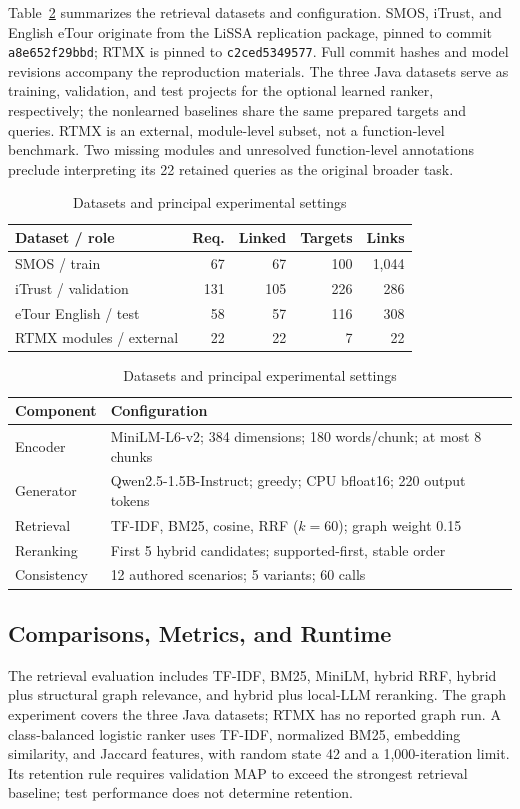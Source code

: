 \documentclass[conference,letterpaper,10pt]{IEEEtran}
\begin{document}
Table~\ref{tab:setup} summarizes the retrieval datasets and configuration. SMOS, iTrust, and English eTour originate from the LiSSA replication package, pinned to commit \texttt{a8e652f29bbd}; RTMX \cite{rtmx} is pinned to \texttt{c2ced5349577}. Full commit hashes and model revisions accompany the reproduction materials. The three Java datasets serve as training, validation, and test projects for the optional learned ranker, respectively; the nonlearned baselines share the same prepared targets and queries. RTMX is an external, module-level subset, not a function-level benchmark. Two missing modules and unresolved function-level annotations preclude interpreting its 22 retained queries as the original broader task.
\begin{table}[t]
\caption{Datasets and principal experimental settings}
\label{tab:setup}\centering
\begin{tabular}{@{}lrrrr@{}}\toprule
Dataset / role & Req. & Linked & Targets & Links\\\midrule
SMOS / train & 67 & 67 & 100 & 1,044\\
iTrust / validation & 131 & 105 & 226 & 286\\
eTour English / test & 58 & 57 & 116 & 308\\
RTMX modules / external & 22 & 22 & 7 & 22\\\bottomrule
\end{tabular}
\smallskip
\begin{tabular}{@{}p{}p{}@{}}\toprule
Component & Configuration\\\midrule
Encoder & MiniLM-L6-v2; 384 dimensions; 180 words/chunk; at most 8 chunks\\
Generator & Qwen2.5-1.5B-Instruct; greedy; CPU bfloat16; 220 output tokens\\
Retrieval & TF-IDF, BM25, cosine, RRF ($k=60$); graph weight 0.15\\
Reranking & First 5 hybrid candidates; supported-first, stable order\\
Consistency & 12 authored scenarios; 5 variants; 60 calls\\\bottomrule
\end{tabular}
\end{table}

\subsection{Comparisons, Metrics, and Runtime}
The retrieval evaluation includes TF-IDF, BM25, MiniLM, hybrid RRF, hybrid plus structural graph relevance, and hybrid plus local-LLM reranking. The graph experiment covers the three Java datasets; RTMX has no reported graph run. A class-balanced logistic ranker uses TF-IDF, normalized BM25, embedding similarity, and Jaccard features, with random state 42 and a 1,000-iteration limit. Its retention rule requires validation MAP to exceed the strongest retrieval baseline; test performance does not determine retention.
\end{document}
